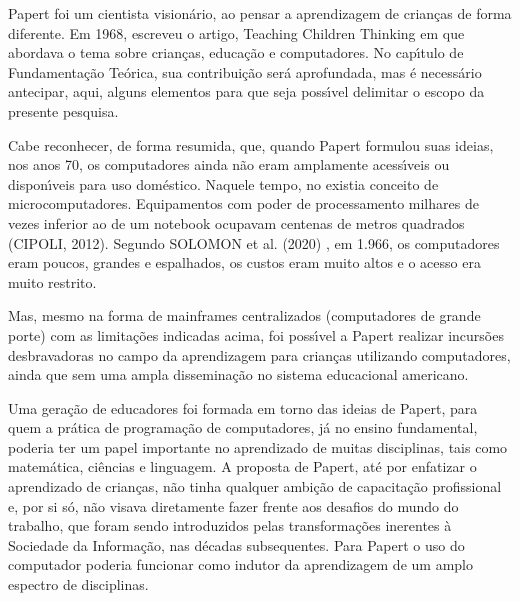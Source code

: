 \documentclass[
12pt,		%
openright,	%
twoside,  %
a4paper,			%
chapter=TITLE,		%
english,			%
french,				%
spanish,			%
brazil				%
]{USPSC-classe/USPSC}
\begin{document}
Papert foi um cientista vision\'ario, ao pensar a aprendizagem de crian\c{c}as de forma diferente. Em 1968, escreveu o artigo, \textquotedbl  Teaching Children Thinking \textquotedbl   em que abordava  o tema sobre crian\c{c}as, educa\c{c}\~ao e computadores. No cap\'{\i}tulo de Fundamenta\c{c}\~ao Te\'orica, sua contribui\c{c}\~ao ser\'a aprofundada, mas \'e necess\'ario antecipar, aqui, alguns elementos para que seja poss\'{\i}vel delimitar o escopo da presente pesquisa.








Cabe reconhecer, de forma resumida, que, quando Papert formulou suas ideias, nos anos 70, os computadores ainda n\~ao eram amplamente acess\'{\i}veis ou dispon\'{\i}veis para uso dom\'estico. Naquele tempo, no existia conceito de \textquotedbl microcomputadores\textquotedbl . Equipamentos com poder de processamento milhares de vezes inferior ao de um notebook ocupavam centenas de metros quadrados  (CIPOLI, 2012). Segundo  SOLOMON et al. (2020) , \textquotedbl em 1.966, os computadores eram poucos, grandes e espalhados\textquotedbl , os custos eram muito altos e o acesso era muito restrito.








Mas, mesmo na forma de mainframes centralizados (computadores de grande porte) com as limita\c{c}\~oes indicadas acima, foi poss\'{\i}vel a Papert realizar incurs\~oes desbravadoras no campo da aprendizagem para crian\c{c}as utilizando computadores, ainda que sem uma ampla dissemina\c{c}\~ao no sistema educacional americano.








Uma gera\c{c}\~ao de educadores foi formada em torno das ideias de Papert, para quem a pr\'atica de programa\c{c}\~ao de computadores, j\'a no ensino fundamental, poderia ter um papel importante no aprendizado de muitas disciplinas, tais como matem\'atica, ci\^encias e linguagem. A proposta de Papert, at\'e por enfatizar o aprendizado de crian\c{c}as, n\~ao tinha qualquer ambi\c{c}\~ao de capacita\c{c}\~ao profissional e, por si s\'o, n\~ao visava diretamente fazer frente aos desafios do \textquotedbl mundo do trabalho\textquotedbl , que foram sendo introduzidos pelas transforma\c{c}\~oes inerentes \`a Sociedade da Informa\c{c}\~ao, nas d\'ecadas subsequentes. Para Papert o uso do computador poderia funcionar como indutor da aprendizagem de um amplo espectro de disciplinas.
\end{document}
